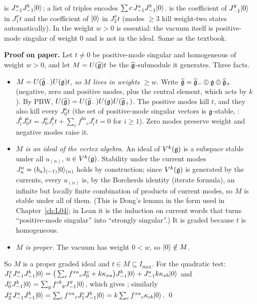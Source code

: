 \begin{dictionary}
 is $J^a_{-1}J^b_{-1}|0\rangle$; a list of triples  encodes $\sum c\,J^a_{-1}J^b_{-1}|0\rangle$.
 is the coefficient of $J^g_{-1}|0\rangle$ in $J^x_1t$ and  the coefficient of $|0\rangle$ in
$J^x_2t$ (modes $\ge3$ kill weight-two states automatically). In  the weight $w>0$ is essential: the
vacuum itself is positive-mode singular of weight $0$ and is not in the ideal. Same as the textbook.
\end{dictionary}

\textbf{Proof on paper.} Let $t\ne0$ be positive-mode singular and homogeneous of weight $w>0$, and let $M=U(\widehat{\mathfrak g})t$ be
the $\widehat{\mathfrak g}$-submodule it generates. Three facts.
\begin{itemize}
\item \emph{$M=U(\widehat{\mathfrak g}_-)U(\mathfrak g)t$, so $M$ lives in weights $\ge w$.} Write
  $\widehat{\mathfrak g}=\widehat{\mathfrak g}_-\oplus\mathfrak g\oplus\widehat{\mathfrak g}_+$ (negative, zero and positive modes, plus the central
  element, which acts by $k$). By PBW, $U(\widehat{\mathfrak g})=U(\widehat{\mathfrak g}_-)U(\mathfrak g)U(\widehat{\mathfrak g}_+)$. The positive modes kill
  $t$, and they also kill every $J^a_0t$ (the set of positive-mode singular vectors is $\mathfrak g$-stable, : $J^b_iJ^a_0t
  =J^a_0J^b_it+\sum_cf^{ba}{}_cJ^c_it=0$ for $i\ge1$). Zero modes preserve weight and negative modes raise it.
\item \emph{$M$ is an ideal of the vertex algebra.} An ideal of $V^k(\mathfrak g)$ is a subspace stable under all $u_{(n)}$, $u\in V^k(\mathfrak g)$.
  Stability under the current modes $J^a_n=(b_a)_{(-1)}|0\rangle{}_{(n)}$ holds by construction; since $V^k(\mathfrak g)$ is generated by the
  currents, every $u_{(n)}$ is, by the Borcherds identity (iterate formula), an infinite but locally finite combination of products of
  current modes, so $M$ is stable under all of them. (This is Dong's lemma in the form used in Chapter~\ref{ch:L04}; in Lean it is the
  induction on current words that turns ``positive-mode singular'' into ``strongly singular''.) It is graded because $t$ is homogeneous.
\item \emph{$M$ is proper.} The vacuum has weight $0<w$, so $|0\rangle\notin M$.
\end{itemize}
So $M$ is a proper graded ideal and $t\in M\subseteq I_{\max}$. For the quadratic test:
$J^x_1J^a_{-1}J^b_{-1}|0\rangle=\big(\sum_c f^{xa}{}_cJ^c_0+k\kappa_{xa}\big)J^b_{-1}|0\rangle+J^a_{-1}k\kappa_{xb}|0\rangle$ and
$J^c_0J^b_{-1}|0\rangle=\sum_g f^{cb}{}_gJ^g_{-1}|0\rangle$, which gives ; similarly
$J^x_2J^a_{-1}J^b_{-1}|0\rangle=\sum_c f^{xa}{}_c J^c_1J^b_{-1}|0\rangle=k\sum_cf^{xa}{}_c\kappa_{cb}|0\rangle$. \qed

